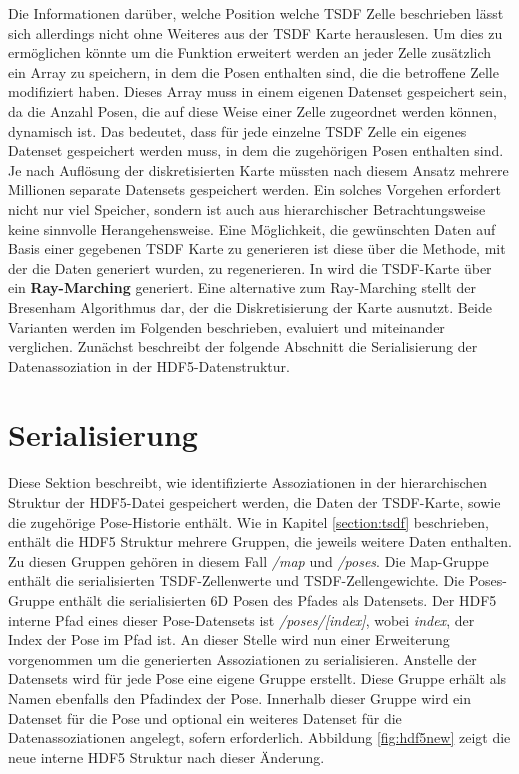 Die Informationen darüber, welche Position welche TSDF Zelle beschrieben lässt sich allerdings nicht ohne Weiteres aus der TSDF Karte herauslesen.
Um dies zu ermöglichen könnte \cite{HATSDF} um die Funktion erweitert werden an jeder Zelle zusätzlich ein Array zu speichern, in dem die Posen enthalten sind, die die betroffene Zelle modifiziert haben. Dieses Array muss in einem eigenen Datenset gespeichert sein, da die Anzahl Posen, die auf diese Weise einer Zelle zugeordnet werden können, dynamisch ist. Das bedeutet, dass für jede einzelne TSDF Zelle ein eigenes Datenset gespeichert werden muss, in dem die zugehörigen Posen enthalten sind. Je nach Auflösung der diskretisierten Karte müssten nach diesem Ansatz mehrere Millionen separate Datensets gespeichert werden. Ein solches Vorgehen erfordert nicht nur viel Speicher, sondern ist auch aus hierarchischer Betrachtungsweise keine sinnvolle Herangehensweise.
Eine Möglichkeit, die gewünschten Daten auf Basis einer gegebenen TSDF Karte zu generieren ist diese über die Methode, mit der die Daten generiert wurden, zu regenerieren. In \cite{HATSDF} wird die TSDF-Karte über ein \textbf{Ray-Marching} generiert. Eine alternative zum Ray-Marching stellt der Bresenham Algorithmus dar, der die Diskretisierung der Karte ausnutzt.
Beide Varianten werden im Folgenden beschrieben, evaluiert und miteinander verglichen.
Zunächst beschreibt der folgende Abschnitt die Serialisierung der Datenassoziation in der HDF5-Datenstruktur.

\section{Serialisierung}


Diese Sektion beschreibt, wie identifizierte Assoziationen in der hierarchischen Struktur der HDF5-Datei gespeichert werden, die Daten der TSDF-Karte, sowie die zugehörige Pose-Historie enthält.
Wie in Kapitel \ref{section:tsdf} beschrieben, enthält die HDF5 Struktur mehrere Gruppen, die jeweils weitere Daten enthalten. Zu diesen Gruppen gehören in diesem Fall \textit{/map} und \textit{/poses}.
Die Map-Gruppe enthält die serialisierten TSDF-Zellenwerte und TSDF-Zellengewichte. Die Poses-Gruppe enthält die serialisierten 6D Posen des Pfades als Datensets.
Der HDF5 interne Pfad eines dieser Pose-Datensets ist \textit{/poses/[index]}, wobei \textit{index}, der Index der Pose im Pfad ist.
An dieser Stelle wird nun einer Erweiterung vorgenommen um die generierten Assoziationen zu serialisieren. Anstelle der Datensets wird für jede Pose eine eigene Gruppe erstellt. Diese Gruppe erhält als Namen ebenfalls den Pfadindex der Pose. Innerhalb dieser Gruppe wird ein Datenset für die Pose und optional ein weiteres Datenset für die Datenassoziationen angelegt, sofern erforderlich.
Abbildung \ref{fig:hdf5new} zeigt die neue interne HDF5 Struktur nach dieser Änderung.


